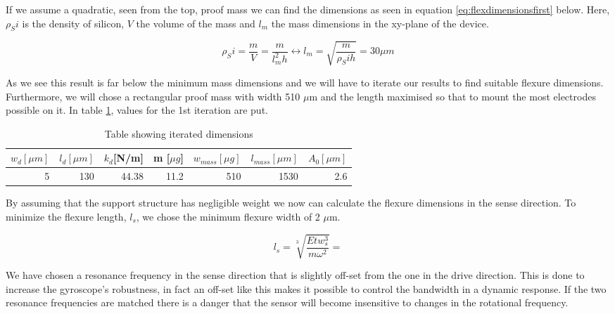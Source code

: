\documentclass[12pt,a4paper,titlepage]{article}
\begin{document}
\begin{spacing}{1.1}
If we assume a quadratic, seen from the top, proof mass we can find the dimensions as seen in  equation \ref{eq:flexdimensionsfirst} below. Here, $\rho_Si$ is the density of silicon, $V$ the volume of the mass and $l_m$ the mass dimensions in the xy-plane of the device.

\begin{equation}
\rho_Si = \dfrac{m}{V} = \dfrac{m}{l_m^2 h} \leftrightarrow l_m = \sqrt{\dfrac{m}{\rho_Si h}} = 30 \mu m
\label{eq:flexdimensionsfirst}
\end{equation}

As we see this result is far below the minimum mass dimensions and we will have to iterate our results to find suitable flexure dimensions. Furthermore, we will chose a rectangular proof mass with width 510 $\mu$m and the length maximised so that to mount the most electrodes possible on it. In table \ref{tab:1stiteration}, values for the 1st iteration are put.

\begin{table}[htbp]
\caption{Table showing iterated dimensions}
\centering
\begin{tabular}{lllllll}
\toprule
$w_d [\mu m]$ & $l_d [\mu m]$ & $k_d$[N/m] & m [$\mu g$] & $w_{mass} [\mu g]$ & $l_{mass} [\mu m]$ & $A_0 [\mu m]$ \\ \midrule
\multicolumn{1}{r}{5} & \multicolumn{1}{r}{130} & \multicolumn{1}{r}{44.38} & \multicolumn{1}{r}{11.2} & \multicolumn{1}{r}{510} & \multicolumn{1}{r}{1530} & \multicolumn{1}{r}{2.6} \\ \bottomrule
\end{tabular}
\label{tab:1stiteration}
\end{table}

By assuming that the support structure has negligible weight we now can calculate the flexure dimensions in the sense direction. To minimize the flexure length, $l_s$, we chose the minimum flexure width of 2 $\mu$m.

\begin{equation}
l_s = \sqrt[3]{\dfrac{E t w_s^3}{m \omega^2} } =
\label{eq:senselength}
\end{equation}

We have chosen a resonance frequency in the sense direction that is slightly off-set from the one in the drive direction. This is done to increase the gyroscope's robustness, in fact an off-set like this makes it possible to control the bandwidth in a dynamic response. If the two resonance frequencies are matched there is a danger that the sensor will become insensitive to changes in the rotational frequency.


\end{spacing}
\end{document}
